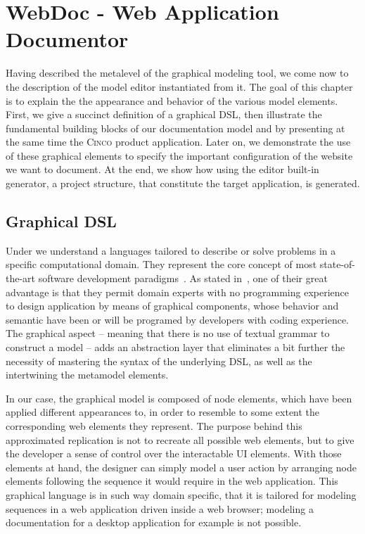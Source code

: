 \chapter{WebDoc - Web Application Documentor}\label{ch:CP}

Having described the metalevel of the graphical modeling tool, we come now to the description of the model editor instantiated from it. The goal of this chapter is to explain the the appearance and behavior of the various model elements. First, we give a succinct definition of a graphical DSL, then illustrate the fundamental building blocks of our documentation model and by presenting at the same time the \textsc{Cinco} product application. Later on, we demonstrate the use of these graphical elements to specify the important configuration of the website we want to document. At the end, we show how using the editor built-in generator, a project structure, that constitute the target application, is generated.

\section{Graphical DSL}\label{sec:gDSL}

Under  we understand a languages tailored to describe or solve problems in a specific computational domain. They represent the core concept of most state-of-the-art software development paradigms~\cite{perez-et_al}. As stated in~\cite{Naujokat2018}, one of their great advantage is that they permit domain experts with no programming experience to design application by means of graphical components, whose behavior and semantic have been or will be programed by developers with coding experience. The graphical aspect -- meaning that there is no use of textual grammar to construct a model -- adds an abstraction layer that eliminates a bit further the necessity of mastering the syntax of the underlying DSL, as well as the  intertwining the metamodel elements.

In our case, the graphical model is composed of node elements, which have been applied different appearances to, in order to resemble to some extent the corresponding web elements they represent. The purpose behind this approximated replication is not to recreate all possible web elements, but to give the developer a sense of control over the interactable UI elements. With those elements at hand, the designer can simply model a user action by arranging node elements following the sequence it would require in the web application. This graphical language is in such way domain specific, that it is tailored for modeling sequences in a web application driven inside a web browser; modeling a documentation for a desktop application for example is not possible.

